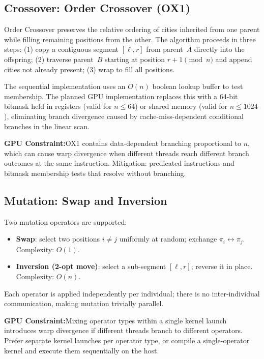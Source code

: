 \documentclass[11pt, letterpaper]{article}
\newcommand{\warn}[1]{%
  \vspace{0.4em}
  \noindent\colorbox{orange!10}{\parbox{\dimexpr\linewidth-2\fboxsep}{%
    \footnotesize\textbf{GPU Constraint:}\enspace #1
  }}
  \vspace{0.4em}
}
\begin{document}
\subsection{Crossover: Order Crossover (OX1)}
\label{sec:ox1}

Order Crossover preserves the relative ordering of cities inherited from one
parent while filling remaining positions from the other.  The algorithm proceeds
in three steps: (1) copy a contiguous segment $[\ell, r]$ from parent~$A$
directly into the offspring; (2) traverse parent~$B$ starting at position
$r+1 \pmod{n}$ and append cities not already present; (3) wrap to fill all
positions.

The sequential implementation uses an $O(n)$ boolean lookup buffer to test
membership.  The planned GPU implementation replaces this with a 64-bit
bitmask held in registers (valid for $n \leq 64$) or shared memory (valid for
$n \leq 1024$), eliminating branch divergence caused by cache-miss-dependent
conditional branches in the linear scan.

\warn{OX1 contains data-dependent branching proportional to $n$, which can
cause warp divergence when different threads reach different branch outcomes at
the same instruction.  Mitigation: predicated instructions and bitmask
membership tests that resolve without branching.}

\subsection{Mutation: Swap and Inversion}

Two mutation operators are supported:

\begin{itemize}[noitemsep]
  \item \textbf{Swap}: select two positions $i \neq j$ uniformly at random;
    exchange $\pi_i \leftrightarrow \pi_j$.  Complexity: $O(1)$.
  \item \textbf{Inversion (2-opt move)}: select a sub-segment $[\ell, r]$;
    reverse it in place.  Complexity: $O(n)$.
\end{itemize}

Each operator is applied independently per individual; there is no
inter-individual communication, making mutation trivially parallel.

\warn{Mixing operator types within a single kernel launch introduces warp
divergence if different threads branch to different operators.  Prefer separate
kernel launches per operator type, or compile a single-operator kernel and
execute them sequentially on the host.}
\end{document}
